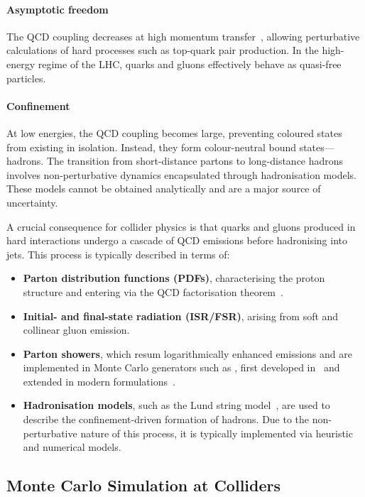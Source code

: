 \paragraph{Asymptotic freedom}
The QCD coupling decreases at high momentum transfer~\cite{standardmodel6,standardmodel7}, allowing perturbative calculations of hard processes such as top-quark pair production. In the high-energy regime of the LHC, quarks and gluons effectively behave as quasi-free particles.

\paragraph{Confinement}
At low energies, the QCD coupling becomes large, preventing coloured states from existing in isolation. Instead, they form colour-neutral bound states—hadrons. The transition from short-distance partons to long-distance hadrons involves non-perturbative dynamics encapsulated through hadronisation models. These models cannot be obtained analytically and are a major source of uncertainty.

A crucial consequence for collider physics is that quarks and gluons produced in hard interactions undergo a cascade of QCD emissions before hadronising into jets. This process is typically described in terms of:
\begin{itemize}
  \item \textbf{Parton distribution functions (PDFs)}, characterising the proton structure and entering via the QCD factorisation theorem~\cite{collins_soper_sterman}.
  \item \textbf{Initial- and final-state radiation (ISR/FSR)}, arising from soft and collinear gluon emission.
  \item \textbf{Parton showers}, which resum logarithmically enhanced emissions and are implemented in Monte Carlo generators such as \pythia, first developed in~\cite{SJOSTRAND1985321,parton_shower} and extended in modern formulations~\cite{pythia}.
  \item \textbf{Hadronisation models}, such as the Lund string model~\cite{lund_model,SJOSTRAND1984469}, are used to describe the confinement-driven formation of hadrons. Due to the non-perturbative nature of this process, it is typically implemented via heuristic and numerical models.
\end{itemize}


\subsection{Monte Carlo Simulation at Colliders}
\label{sec:mc_colliders}


